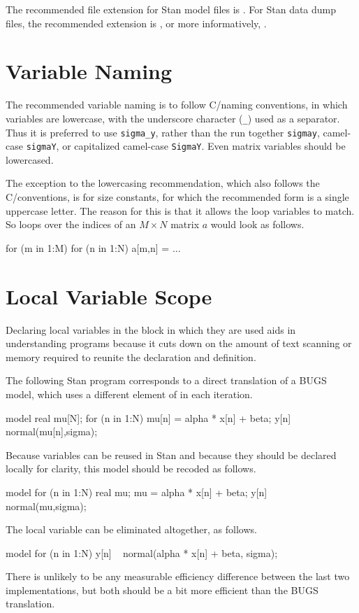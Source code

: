 The recommended file extension for Stan model files is .  
For Stan data dump files, the recommended extension is , or
more informatively, .

\section{Variable Naming}

The recommended variable naming is to follow C/\Cpp naming
conventions, in which variables are lowercase, with the underscore
character (\Verb|_|) used as a separator.  Thus it is preferred to use
\Verb|sigma_y|, rather than the run together \Verb|sigmay|, camel-case
\Verb|sigmaY|, or capitalized camel-case \Verb|SigmaY|.  Even matrix
variables should be lowercased.

The exception to the lowercasing recommendation, which also follows
the C/\Cpp conventions, is for size constants, for which the
recommended form is a single uppercase letter.  The reason for this is
that it allows the loop variables to match.  So loops over the indices of
an $M \times N$ matrix $a$ would look as follows.
%
\begin{stancode}
for (m in 1:M)
  for (n in 1:N)
     a[m,n] = ...
\end{stancode}


\section{Local Variable Scope}

Declaring local variables in the block in which they are used aids in
understanding programs because it cuts down on the amount of text
scanning or memory required to reunite the declaration and definition.

The following Stan program corresponds to a direct translation of a
BUGS model, which uses a different element of  in each
iteration.
%
\begin{stancode}
model {
  real mu[N];
  for (n in 1:N) {
    mu[n] = alpha * x[n] + beta;
    y[n] ~ normal(mu[n],sigma);
  }
}
\end{stancode}
%
Because variables can be reused in Stan and because they should be
declared locally for clarity, this model should be recoded as follows.
%
\begin{stancode}
model {
  for (n in 1:N) {
    real mu;
    mu = alpha * x[n] + beta;
    y[n] ~ normal(mu,sigma);
  }
}
\end{stancode}
% 
The local variable can be eliminated altogether, as follows.
%
\begin{stancode}
model {
  for (n in 1:N)
    y[n] ~ normal(alpha * x[n] + beta, sigma);
}
\end{stancode}
%
There is unlikely to be any measurable efficiency difference
between the last two implementations, but both should be a bit
more efficient than the BUGS translation.

